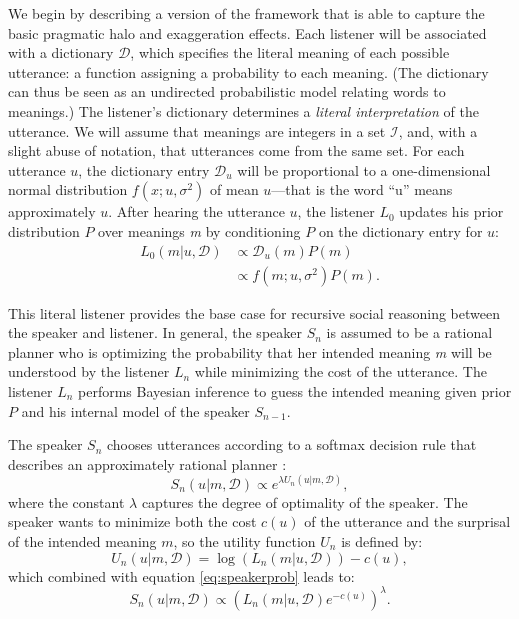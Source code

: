\documentclass{article} %
\newcommand{\dictionary}{\ensuremath{\mathcal{D}}\xspace}
\begin{document}
We begin by describing a version of the framework that is able to capture the basic pragmatic halo and exaggeration effects.
Each listener will be associated with a dictionary $\dictionary$, which specifies the literal meaning of each possible utterance: a function assigning a probability to each meaning. (The dictionary can thus be seen as an undirected probabilistic model relating words to meanings.) The listener's dictionary determines a \emph{literal interpretation} of the utterance. We will assume that meanings are integers in a set $\mathcal{I}$, and, with a slight abuse of notation, that utterances come from the same set. For each utterance $u$, the dictionary entry $\dictionary_u$ will be proportional to a one-dimensional normal distribution $f(x;u,\sigma^2)$ of mean $u$---that is the word ``u'' means approximately $u$. After hearing the utterance $u$, the listener $L_0$ updates his prior distribution $P$ over meanings \emph{m} by conditioning $P$ on the dictionary entry for $u$:
\begin{align}\label{eq:literallistener}
L_0(m | u, \dictionary) &\propto \dictionary_u(m)P(m) \\
&\propto f(m;u,\sigma^2)P(m).
\end{align}

This literal listener provides the base case for recursive social reasoning between the speaker and listener. In general, the speaker $S_n$ is assumed to be a rational planner who is optimizing the probability that her intended meaning \emph{m} will be understood by the listener $L_n$ while minimizing the cost of the utterance. The listener $L_n$ performs Bayesian inference to guess the intended meaning given prior $P$ and his internal model of the speaker $S_{n-1}$.

The speaker $S_n$ chooses utterances according to a softmax decision rule that describes an approximately rational planner \cite{sutton1998reinforcement}:
\begin{equation}\label{eq:speakerprob}
S_n(u | m,\dictionary) \propto e^{\lambda U_n(u | m,\dictionary)},
\end{equation}
where the constant $\lambda$ captures the degree of optimality of the speaker. 
The speaker wants to minimize both the cost $c(u)$ of the utterance and the surprisal of the intended meaning $m$, so the utility function $U_n$ is defined by:
\begin{equation}\label{eq:speakerutility}
U_n(u | m, \dictionary) = \log (L_{n}(m | u, \dictionary)) - c(u),
\end{equation}
which combined with equation \ref{eq:speakerprob} leads to:
\begin{equation}\label{eq:speakersimplified}
S_n(u | m, \dictionary) \propto (L_{n}(m | u,\dictionary)e^{-c(u)}) ^\lambda.
\end{equation}
\end{document}
